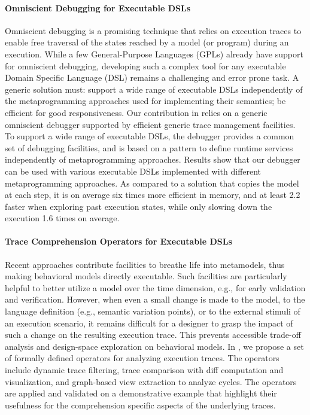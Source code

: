 \paragraph{Omniscient Debugging for Executable DSLs}

Omniscient debugging is a promising technique that relies on execution traces to enable free traversal of the states reached by a model (or program) during an execution. While a few General-Purpose Languages (GPLs) already have support for omniscient debugging, developing such a complex tool for any executable Domain Specific Language (DSL) remains a challenging and error prone task. A generic solution must: support a wide range of executable DSLs independently of the metaprogramming approaches used for implementing their semantics; be efficient for good responsiveness. Our contribution in \cite{bousse:hal-01662336} relies on a generic omniscient debugger supported by efficient generic trace management facilities. To support a wide range of executable DSLs, the debugger provides a common set of debugging facilities, and is based on a pattern to define runtime services independently of metaprogramming approaches. Results show that our debugger can be used with various executable DSLs implemented with different metaprogramming approaches. As compared to a solution that copies the model at each step, it is on average six times more efficient in memory, and at least 2.2 faster when exploring past execution states, while only slowing down the execution 1.6 times on average.

\paragraph{Trace Comprehension Operators for Executable DSLs}

Recent approaches contribute facilities to breathe life into metamodels, thus making behavioral models directly executable. Such facilities are particularly helpful to better utilize a model over the time dimension, e.g., for early validation and verification. However, when even a small change is made to the model, to the language definition (e.g., semantic variation points), or to the external stimuli of an execution scenario, it remains difficult for a designer to grasp the impact of such a change on the resulting execution trace. This prevents accessible trade-off analysis and design-space exploration on behavioral models. In \cite{leroy:hal-01803031}, we propose a set of formally defined operators for analyzing execution traces. The operators include dynamic trace filtering, trace comparison with diff computation and visualization, and graph-based view extraction to analyze cycles. The operators are applied and validated on a demonstrative example that highlight their usefulness for the comprehension specific aspects of the underlying traces.

